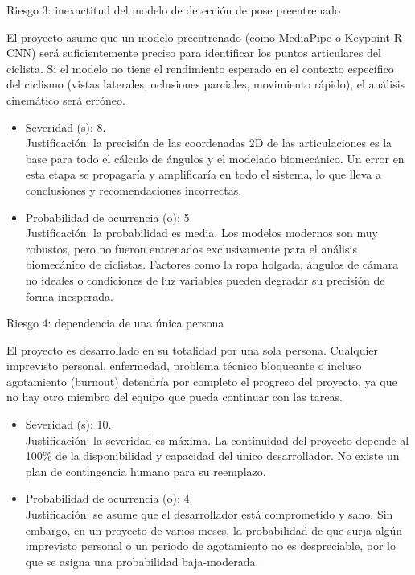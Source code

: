 \documentclass[
11pt, %
]{charter}
\begin{document}
Riesgo 3: inexactitud del modelo de detección de pose preentrenado

El proyecto asume que un modelo preentrenado (como MediaPipe o Keypoint R-CNN) será suficientemente preciso para identificar los puntos articulares del ciclista. Si el modelo no tiene el rendimiento esperado en el contexto específico del ciclismo (vistas laterales, oclusiones parciales, movimiento rápido), el análisis cinemático será erróneo.
\begin{itemize}
  \item Severidad (s): 8.\\
  Justificación: la precisión de las coordenadas 2D de las articulaciones es la base para todo el cálculo de ángulos y el modelado biomecánico. Un error en esta etapa se propagaría y amplificaría en todo el sistema, lo que lleva a conclusiones y recomendaciones incorrectas.
  \item Probabilidad de ocurrencia (o): 5.\\
  Justificación: la probabilidad es media. Los modelos modernos son muy robustos, pero no fueron entrenados exclusivamente para el análisis biomecánico de ciclistas. Factores como la ropa holgada, ángulos de cámara no ideales o condiciones de luz variables pueden degradar su precisión de forma inesperada.
\end{itemize}

Riesgo 4: dependencia de una única persona

El proyecto es desarrollado en su totalidad por una sola persona. Cualquier imprevisto personal, enfermedad, problema técnico bloqueante o incluso agotamiento (burnout) detendría por completo el progreso del proyecto, ya que no hay otro miembro del equipo que pueda continuar con las tareas.
\begin{itemize}
    \item Severidad (s): 10.\\
    Justificación: la severidad es máxima. La continuidad del proyecto depende al 100\% de la disponibilidad y capacidad del único desarrollador. No existe un plan de contingencia humano para su reemplazo.
    \item Probabilidad de ocurrencia (o): 4.\\
    Justificación: se asume que el desarrollador está comprometido y sano. Sin embargo, en un proyecto de varios meses, la probabilidad de que surja algún imprevisto personal o un periodo de agotamiento no es despreciable, por lo que se asigna una probabilidad baja-moderada.
\end{itemize}
\end{document}
